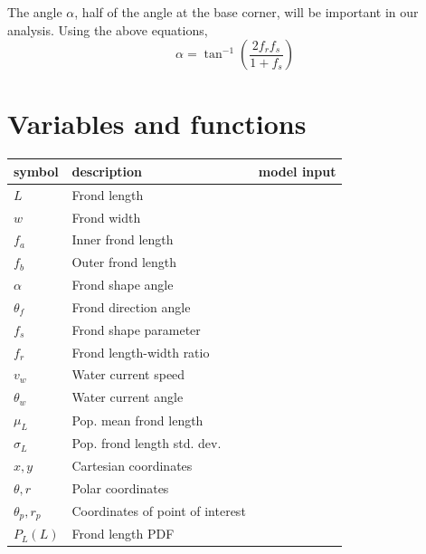 \documentclass[10pt]{article}
\newenvironment{mcfig}
	{\par\medskip\noindent\minipage{\linewidth}}
	{\endminipage\par\medskip}
\begin{document}
\begin{multicols}{2}
The angle $\alpha$, half of the angle at the base corner, will be important in our analysis.
Using the above equations,
\begin{equation}
	\alpha = \tan^{-1}\left(\frac{2f_rf_s}{1+f_s}\right)
\end{equation}

\section{Variables and functions}
\begin{mcfig}
	\centering
	\begin{tabular}{@{}llc@{}} \toprule
		symbol                    & description                         & model input \\ \midrule
		$L$                       & Frond length                        & \\
		$w$                       & Frond width                         & \\
		$f_a$                     & Inner frond length                  & \\
		$f_b$                     & Outer frond length                  & \\
		$\alpha$                  & Frond shape angle                   & \\
		$\theta_f$                & Frond direction angle               & \\
		$f_s$                     & Frond shape parameter               & \checkmark \\
		$f_r$                     & Frond length-width ratio            & \checkmark \\
		$v_w$                     & Water current speed                 & \checkmark \\
		$\theta_w$                & Water current angle                 & \checkmark \\
		$\mu_L$                   & Pop. mean frond length              & \checkmark \\
		$\sigma_L$                & Pop. frond length std. dev.         & \checkmark \\
		$x,y$                     & Cartesian coordinates               & \\
		$\theta,r$                & Polar coordinates                   & \\
		$\theta_p,r_p$            & Coordinates of point of interest    & \\
		$P_L(L)$                  & Frond length PDF                    & \\

\end{tabular}
\end{mcfig}
\end{multicols}
\end{document}
